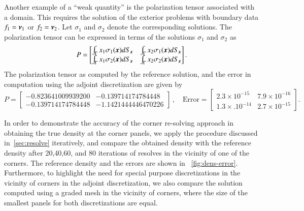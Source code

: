 Another example of a ``weak quantity'' is the polarization tensor associated with a domain. This requires the solution of the
exterior problems with boundary data $f_{1} = \boldsymbol{\nu}_{1}$ or $f_{2} = \boldsymbol{\nu}_{2}$. Let $\sigma_{1}$ and $\sigma_{2}$ denote
the corresponding solutions. The polarization tensor can be expressed in terms of the solutions $\sigma_{1}$ and $\sigma_{2}$
as
\begin{equation}
P = \begin{bmatrix}
\int_{\Gamma} x_{1} \sigma_{1}(\boldsymbol{x}) dS_{\boldsymbol{x}} & \int_{\Gamma} x_{2} \sigma_{1}(\boldsymbol{x}) dS_{\boldsymbol{x}} \\
\int_{\Gamma} x_{1} \sigma_{2}(\boldsymbol{x}) dS_{\boldsymbol{x}} & \int_{\Gamma} x_{2} \sigma_{2}(\boldsymbol{x}) dS_{\boldsymbol{x}} 
\end{bmatrix}.
\end{equation}
The polarization tensor as computed by the reference solution, and the error in computation using the adjoint discretization
are given by
\begin{equation}
P = \begin{bmatrix}
-0.823641009939200 & -0.139714174784448 \\
 -0.139714174784448 &  -1.1421444446470226
\end{bmatrix} \, , \quad \text{Error} = 
\begin{bmatrix} 
2.3 \times 10^{-15} & 7.9 \times 10^{-16} \\
1.3 \times. 10^{-14} & 2.7 \times 10^{-15}
\end{bmatrix}.
\end{equation}

In order to demonstrate the accuracy of the corner re-solving approach in obtaining the true density at the corner panels, we  apply the procedure
discussed in~\cref{sec:resolve} iteratively, and compare the obtained density with the reference density after 20,40,60, and
80 iterations of resolves in the vicinity of one of the corners. The reference density and the errors are shown in ~\cref{fig:dens-error}. Furthermore, to highlight the need for special purpose discretizations in the vicinity of corners in the adjoint discretization, we also compare the solution computed using a graded mesh in the vicinity of corners, where the size of the smallest panels for both discretizations are equal. 

